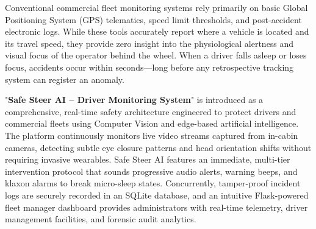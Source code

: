 \documentclass[a4paper,12pt]{report}
\begin{document}
Conventional commercial fleet monitoring systems rely primarily on basic Global Positioning System (GPS) telematics, speed limit thresholds, and post-accident electronic logs. While these tools accurately report where a vehicle is located and its travel speed, they provide zero insight into the physiological alertness and visual focus of the operator behind the wheel. When a driver falls asleep or loses focus, accidents occur within seconds---long before any retrospective tracking system can register an anomaly.

"\textbf{Safe Steer AI -- Driver Monitoring System}" is introduced as a comprehensive, real-time safety architecture engineered to protect drivers and commercial fleets using Computer Vision and edge-based artificial intelligence. The platform continuously monitors live video streams captured from in-cabin cameras, detecting subtle eye closure patterns and head orientation shifts without requiring invasive wearables. Safe Steer AI features an immediate, multi-tier intervention protocol that sounds progressive audio alerts, warning beeps, and klaxon alarms to break micro-sleep states. Concurrently, tamper-proof incident logs are securely recorded in an SQLite database, and an intuitive Flask-powered fleet manager dashboard provides administrators with real-time telemetry, driver management facilities, and forensic audit analytics.
\end{document}
